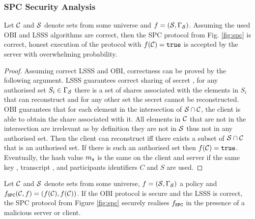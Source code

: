 \subsubsection{SPC Security Analysis}
\begin{lemma}[Correctness]\label{lem:correct}
  Let $\mathcal{C}$ and $\mathcal{S}$ denote sets from some universe and $f=(\mathcal{S},\Gamma_\mathcal{S})$.
  Assuming the used \ac{OBI} and \ac{LSSS} algorithms are correct, then the \ac{SPC} protocol from Fig. \ref{fig:spc} is correct, \ie honest execution of the protocol with $f(\mathcal{C}) = \mathtt{true}$ is accepted by the server with overwhelming probability.\end{lemma}
\begin{proof}
Assuming correct \ac{LSSS} and \ac{OBI}, correctness can be proved by the following argument.
LSSS guarantees correct sharing of secret \secret, \ie for any authorised set $S_i\in \Gamma_\mathcal{S}$ there is a set of shares associated with the elements in $S_i$ that can reconstruct \secret and for any other set the secret cannot be reconstructed. 
OBI guarantees that for each element in the intersection of $\mathcal{S}\cap \mathcal{C}$, the client is able to obtain the share associated with it. 
All elements in $\mathcal{C}$ that are not in the intersection are irrelevant as by definition they are not in $\mathcal{S}$ thus not in any authorised set. 
Then the client can reconstruct \secret iff there exists a subset of $\mathcal{S}\cap \mathcal{C}$ that is an authorised set. 
If there is such an authorised set then $f(\mathcal{C})=\mathtt{true}$. Eventually, the hash value $m_\mathfrak{s}$ is the same on the client and server if the same key \secret, transcript \trans, and participants identifiers $C$ and $S$ are used.
\end{proof}

\begin{lemma}[Privacy]\label{lem:SPCprivacy}
 Let $\mathcal{C}$ and $\mathcal{S}$ denote sets from some universe, $f=(\mathcal{S},\Gamma_\mathcal{S})$ a policy and $f_\mathtt{SPC}(\mathcal{C}, f)=(f(\mathcal{C}), f(\mathcal{C}))$. 
 If the \ac{OBI} protocol is secure and the \ac{LSSS} is correct, the \ac{SPC} protocol from Figure \ref{fig:spc} securely realises $f_\mathtt{SPC}$ in the presence of a malicious server or client.
\end{lemma}

